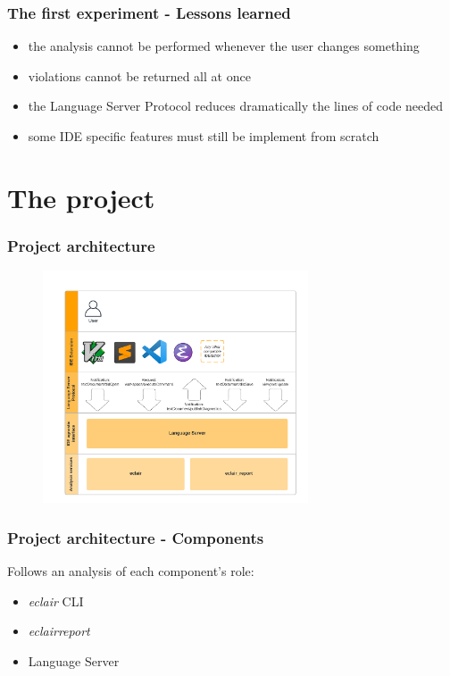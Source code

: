 \documentclass[compress,xcolor={dvipsnames}]{beamer}
\begin{document}
\begin{frame}
  \frametitle{The first experiment - Lessons learned}
  \large

  \begin{itemize}
    \setlength\itemsep{1em}
  
    \item the analysis cannot be performed whenever the user changes something

    \item violations cannot be returned all at once

    \item the Language Server Protocol reduces dramatically the lines of code needed

    \item some IDE specific features must still be implement from scratch
  \end{itemize}
\end{frame}

\section{The project}

\begin{frame}
  \frametitle{Project architecture}
  \large

  \begin{figure}[ht]
    \centering
    \includegraphics[width=0.7\textwidth]{./project_architecture.jpg}
    \label{fig:one}
  \end{figure}
\end{frame}

\begin{frame}
  \frametitle{Project architecture - Components}
  \large

  Follows an analysis of each component's role:
  \vspace{1em}

  \begin{itemize}
    \setlength\itemsep{2em}
  
    \item \emph{eclair} CLI

    \item \emph{eclair\textunderscore report}

    \item Language Server
  \end{itemize}
\end{frame}
\end{document}
